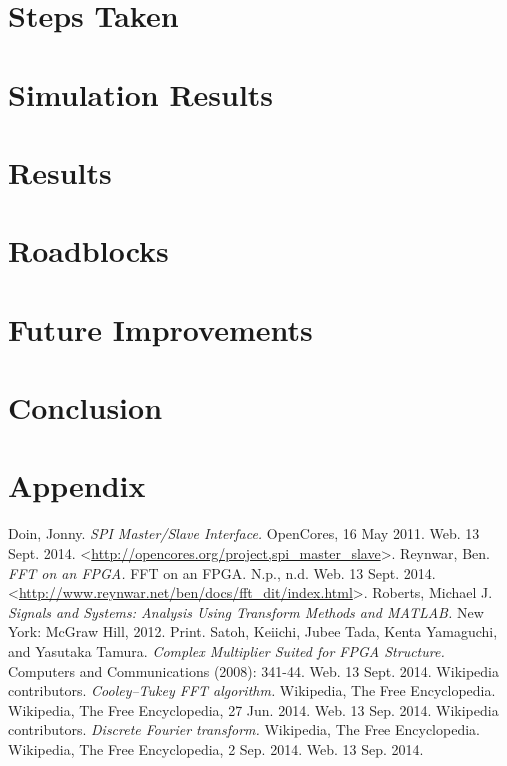 \documentclass[12pt]{article}
\begin{document}
  \section*{Steps Taken}

  \section*{Simulation Results}

  \section*{Results}

  \section*{Roadblocks}

  \section*{Future Improvements}

  \section*{Conclusion}

  \clearpage
  \section*{Appendix}

  \begin{thebibliography}{9}
      Doin, Jonny. \emph{SPI Master/Slave Interface.} OpenCores, 16 May 2011. Web. 13 Sept. 2014. \textless\url{http://opencores.org/project,spi_master_slave}\textgreater.
      Reynwar, Ben. \emph{FFT on an FPGA.} FFT on an FPGA. N.p., n.d. Web. 13 Sept. 2014. \textless\url{http://www.reynwar.net/ben/docs/fft_dit/index.html}\textgreater.
      Roberts, Michael J. \emph{Signals and Systems: Analysis Using Transform Methods and MATLAB.} New York: McGraw Hill, 2012. Print.
      Satoh, Keiichi, Jubee Tada, Kenta Yamaguchi, and Yasutaka Tamura. \emph{Complex Multiplier Suited for FPGA Structure.} Computers and Communications (2008): 341-44. Web. 13 Sept. 2014.
      Wikipedia contributors. \emph{Cooley–Tukey FFT algorithm.} Wikipedia, The Free Encyclopedia. Wikipedia, The Free Encyclopedia, 27 Jun. 2014. Web. 13 Sep. 2014.
      Wikipedia contributors. \emph{Discrete Fourier transform.} Wikipedia, The Free Encyclopedia. Wikipedia, The Free Encyclopedia, 2 Sep. 2014. Web. 13 Sep. 2014.
  \end{thebibliography}
\end{document}
